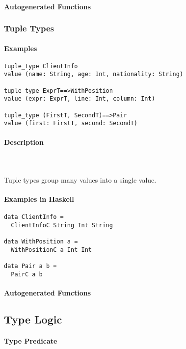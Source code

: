 \documentclass{article}
\def\H{Haskell}
\begin{document}
\paragraph{Autogenerated Functions}

\subsubsection{Tuple Types}

\paragraph{Examples}

\begin{verbatim}
tuple_type ClientInfo
value (name: String, age: Int, nationality: String)

tuple_type ExprT==>WithPosition
value (expr: ExprT, line: Int, column: Int)

tuple_type (FirstT, SecondT)==>Pair
value (first: FirstT, second: SecondT)
\end{verbatim}

\paragraph{Description}\mbox{} \\\\
Tuple types group many values into a single value.

\paragraph{Examples in \H}

\begin{verbatim}
data ClientInfo =
  ClientInfoC String Int String

data WithPosition a = 
  WithPositionC a Int Int

data Pair a b = 
  PairC a b
\end{verbatim}

\paragraph{Autogenerated Functions}

\subsection{Type Logic}

\paragraph{Type Predicate}
\end{document}
